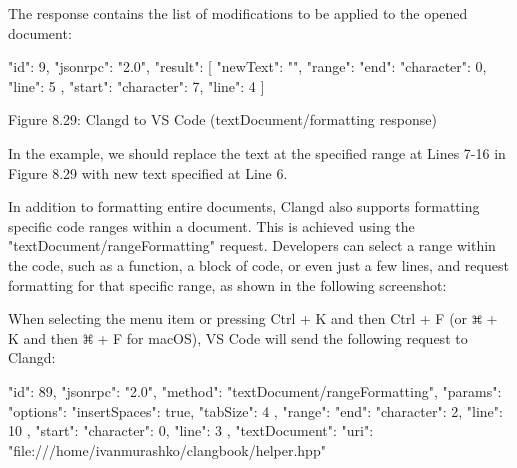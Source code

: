 The response contains the list of modifications to be applied to the opened document:

\begin{shell}
{
  "id": 9,
  "jsonrpc": "2.0",
  "result": [
  {
    "newText": "\n  ",
    "range": {
      "end": {
        "character": 0,
        "line": 5
      },
      "start": {
        "character": 7,
        "line": 4
      }
    }
  }
  ]
}
\end{shell}


\begin{center}
Figure 8.29: Clangd to VS Code (textDocument/formatting response)
\end{center}

In the example, we should replace the text at the specified range at Lines 7-16 in Figure 8.29 with new text specified at Line 6.


In addition to formatting entire documents, Clangd also supports formatting specific code ranges within a document. This is achieved using the "textDocument/rangeFormatting" request. Developers can select a range within the code, such as a function, a block of code, or even just a few lines, and request formatting for that specific range, as shown in the following screenshot:


When selecting the menu item or pressing Ctrl + K and then Ctrl + F (or \includegraphics[width=0.02\textwidth]{content/part2/chapter8/images/3.png} + K and then \includegraphics[width=0.02\textwidth]{content/part2/chapter8/images/3.png} + F for macOS), VS Code will send the following request to Clangd:

\begin{shell}
{
  "id": 89,
  "jsonrpc": "2.0",
  "method": "textDocument/rangeFormatting",
  "params": {
    "options": {
      "insertSpaces": true,
      "tabSize": 4
    },
    "range": {
      "end": {
        "character": 2,
        "line": 10
      },
      "start": {
        "character": 0,
        "line": 3
      }
    },
    "textDocument": {
      "uri": "file:///home/ivanmurashko/clangbook/helper.hpp"
    }
  }
}
\end{shell}

